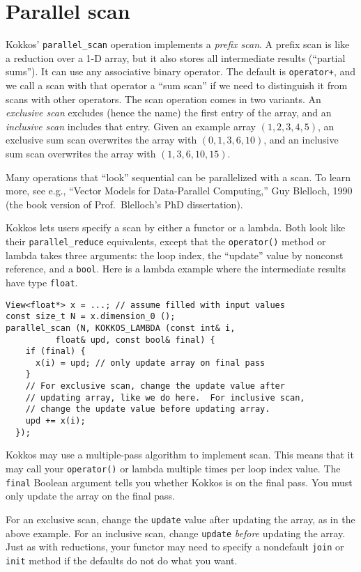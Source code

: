 \section{Parallel scan}

Kokkos' \lstinline!parallel_scan! operation implements a \emph{prefix scan}.
A prefix scan is like a reduction over a 1-D array,
but it also stores all intermediate results (``partial sums'').
It can use any associative binary operator.
The default is \lstinline!operator+!, 
and we call a scan with that operator a ``sum scan''
if we need to distinguish it from scans with other operators.
The scan operation comes in two variants.
An \emph{exclusive scan} excludes (hence the name) the first entry of the array,
and an \emph{inclusive scan} includes that entry.
Given an example array $(1, 2, 3, 4, 5)$, 
an exclusive sum scan overwrites the array with $(0, 1, 3, 6, 10)$,
and an inclusive sum scan overwrites the array with $(1, 3, 6, 10, 15)$.

Many operations that ``look'' sequential can be parallelized with a
scan.  To learn more, see e.g., ``Vector Models for Data-Parallel
Computing,'' Guy Blelloch, 1990 (the book version of Prof.\ Blelloch's
PhD dissertation).

Kokkos lets users specify a scan by either a functor or a lambda.
Both look like their \lstinline!parallel_reduce! equivalents,
except that the \lstinline!operator()! method or lambda takes three arguments:
the loop index, the ``update'' value by nonconst reference, and a \lstinline!bool!.
Here is a lambda example where the intermediate results have type \lstinline!float!.
\begin{lstlisting}
View<float*> x = ...; // assume filled with input values
const size_t N = x.dimension_0 ();
parallel_scan (N, KOKKOS_LAMBDA (const int& i, 
          float& upd, const bool& final) {
    if (final) {
      x(i) = upd; // only update array on final pass
    }
    // For exclusive scan, change the update value after 
    // updating array, like we do here.  For inclusive scan, 
    // change the update value before updating array.
    upd += x(i); 
  });
\end{lstlisting}
Kokkos may use a multiple-pass algorithm to implement scan.
This means that it may call your \lstinline!operator()! or lambda multiple times per loop index value.
The \lstinline!final! Boolean argument tells you whether Kokkos is on the final pass.
You must only update the array on the final pass.

For an exclusive scan, change the \lstinline!update! value after
updating the array, as in the above example.  For an inclusive scan,
change \lstinline!update! \emph{before} updating the array.  Just as
with reductions, your functor may need to specify a nondefault
\lstinline!join! or \lstinline!init! method if the defaults do not do
what you want.

